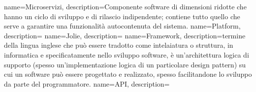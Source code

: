  {
	name=Microservizi,
	description={Componente software di dimensioni ridotte che hanno un ciclo di sviluppo e di rilascio indipendente; contiene tutto quello che serve a garantire una funzionalità autocontenuta del sistema.}
}
 {
	name=Platform,
	description={}
}
 {
	name=Jolie,
	description={}
}
 {
	name=Framework,
	description={termine della lingua inglese che può essere tradotto come intelaiatura o struttura, in informatica e specificatamente nello sviluppo software, è un'architettura logica di supporto (spesso un'implementazione logica di un particolare design pattern) su cui un software può essere progettato e realizzato, spesso facilitandone lo sviluppo da parte del programmatore.}
}
 {
	name=API,
	description={}
}
